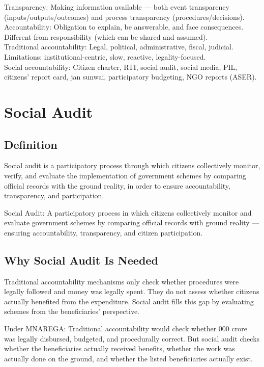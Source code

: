 \begin{QuickRevision}
Transparency: Making information available --- both event transparency (inputs/outputs/outcomes) and process transparency (procedures/decisions).\\
Accountability: Obligation to explain, be answerable, and face consequences. Different from responsibility (which can be shared and assumed).\\
Traditional accountability: Legal, political, administrative, fiscal, judicial. Limitations: institutional-centric, slow, reactive, legality-focused.\\
Social accountability: Citizen charter, RTI, social audit, social media, PIL, citizens' report card, jan sunwai, participatory budgeting, NGO reports (ASER).
\end{QuickRevision}

\section{Social Audit}

\subsection{Definition}
Social audit is a participatory process through which citizens collectively monitor, verify, and evaluate the implementation of government schemes by comparing official records with the ground reality, in order to ensure accountability, transparency, and participation.

\begin{KeyConcept}
Social Audit: A participatory process in which citizens collectively monitor and evaluate government schemes by comparing official records with ground reality --- ensuring accountability, transparency, and citizen participation.
\end{KeyConcept}

\subsection{Why Social Audit Is Needed}
Traditional accountability mechanisms only check whether procedures were legally followed and money was legally spent. They do not assess whether citizens actually benefited from the expenditure. Social audit fills this gap by evaluating schemes from the beneficiaries' perspective.

\begin{ExampleBox}
Under MNAREGA: Traditional accountability would check whether 000 crore was legally disbursed, budgeted, and procedurally correct. But social audit checks whether the beneficiaries actually received benefits, whether the work was actually done on the ground, and whether the listed beneficiaries actually exist.
\end{ExampleBox}


